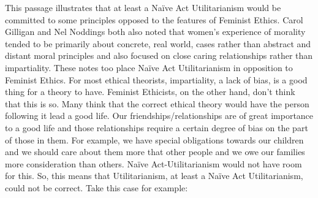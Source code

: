 This passage illustrates that at least a Naïve Act Utilitarianism would be committed to some principles opposed to the features of Feminist Ethics.  Carol Gilligan and Nel Noddings both also noted that women’s experience of morality tended to be primarily about concrete, real world, cases rather than abstract and distant moral principles and also focused on close caring relationships rather than impartiality. These notes too place Naïve Act Utilitarianism in opposition to Feminist Ethics. For most ethical theorists, impartiality, a lack of bias, is a good thing for a theory to have. Feminist Ethicists, on the other hand, don't think that this is so. Many think that the correct ethical theory would have the person following it lead a good life. Our friendships/relationships are of great importance to a good life and those relationships require a certain degree of bias on the part of those in them. For example, we have special obligations towards our children and we should care about them more that other people and we owe our families more consideration than others. Naïve Act-Utilitarianism would not have room for this. So, this means that Utilitarianism, at least a Naïve Act Utilitarianism, could not be correct. Take this case for example:


